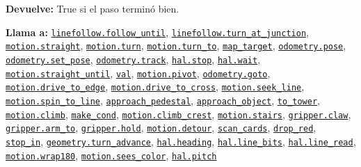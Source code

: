 \par{}\par\smallskip
\noindent\textbf{Devuelve:} True si el paso terminó bien.\par
\noindent\textbf{Llama a:} \hyperref[fn:linefollow:follow-until]{\texttt{linefollow.follow\_\allowbreak{}until}}, \hyperref[fn:linefollow:turn-at-junction]{\texttt{linefollow.turn\_\allowbreak{}at\_\allowbreak{}junction}}, \hyperref[fn:motion:straight]{\texttt{motion.straight}}, \hyperref[fn:motion:turn]{\texttt{motion.turn}}, \hyperref[fn:motion:turn-to]{\texttt{motion.turn\_\allowbreak{}to}}, \hyperref[fn:autonomous:map-target]{\texttt{map\_\allowbreak{}target}}, \hyperref[fn:odometry:pose]{\texttt{odometry.pose}}, \hyperref[fn:odometry:set-pose]{\texttt{odometry.set\_\allowbreak{}pose}}, \hyperref[fn:odometry:track]{\texttt{odometry.track}}, \hyperref[fn:hal:stop]{\texttt{hal.stop}}, \hyperref[fn:hal:wait]{\texttt{hal.wait}}, \hyperref[fn:motion:straight-until]{\texttt{motion.straight\_\allowbreak{}until}}, \hyperref[fn:autonomous:val]{\texttt{val}}, \hyperref[fn:motion:pivot]{\texttt{motion.pivot}}, \hyperref[fn:odometry:goto]{\texttt{odometry.goto}}, \hyperref[fn:motion:drive-to-edge]{\texttt{motion.drive\_\allowbreak{}to\_\allowbreak{}edge}}, \hyperref[fn:motion:drive-to-cross]{\texttt{motion.drive\_\allowbreak{}to\_\allowbreak{}cross}}, \hyperref[fn:motion:seek-line]{\texttt{motion.seek\_\allowbreak{}line}}, \hyperref[fn:motion:spin-to-line]{\texttt{motion.spin\_\allowbreak{}to\_\allowbreak{}line}}, \hyperref[fn:autonomous:approach-pedestal]{\texttt{approach\_\allowbreak{}pedestal}}, \hyperref[fn:autonomous:approach-object]{\texttt{approach\_\allowbreak{}object}}, \hyperref[fn:autonomous:to-tower]{\texttt{to\_\allowbreak{}tower}}, \hyperref[fn:motion:climb]{\texttt{motion.climb}}, \hyperref[fn:autonomous:make-cond]{\texttt{make\_\allowbreak{}cond}}, \hyperref[fn:motion:climb-crest]{\texttt{motion.climb\_\allowbreak{}crest}}, \hyperref[fn:motion:stairs]{\texttt{motion.stairs}}, \hyperref[fn:gripper:claw]{\texttt{gripper.claw}}, \hyperref[fn:gripper:arm-to]{\texttt{gripper.arm\_\allowbreak{}to}}, \hyperref[fn:gripper:hold]{\texttt{gripper.hold}}, \hyperref[fn:motion:detour]{\texttt{motion.detour}}, \hyperref[fn:autonomous:scan-cards]{\texttt{scan\_\allowbreak{}cards}}, \hyperref[fn:autonomous:drop-red]{\texttt{drop\_\allowbreak{}red}}, \hyperref[fn:autonomous:stop-in]{\texttt{stop\_\allowbreak{}in}}, \hyperref[fn:geometry:turn-advance]{\texttt{geometry.turn\_\allowbreak{}advance}}, \hyperref[fn:hal:heading]{\texttt{hal.heading}}, \hyperref[fn:hal:line-bits]{\texttt{hal.line\_\allowbreak{}bits}}, \hyperref[fn:hal:line-read]{\texttt{hal.line\_\allowbreak{}read}}, \hyperref[fn:motion:wrap180]{\texttt{motion.wrap180}}, \hyperref[fn:motion:sees-color]{\texttt{motion.sees\_\allowbreak{}color}}, \hyperref[fn:hal:pitch]{\texttt{hal.pitch}}\par

